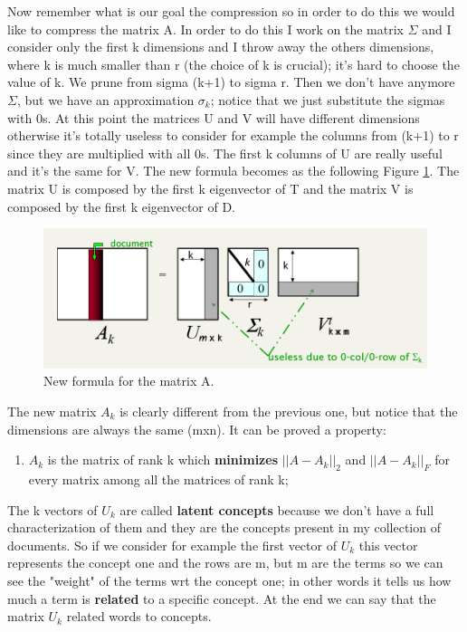 Now remember what is our goal the compression so in order to do this we would like to compress the matrix A. In order to do this I work on the matrix $\Sigma$ and I consider only the first k dimensions and I throw away the others dimensions, where k is much smaller than r (the choice of k is crucial); it's hard to choose the value of k. We prune from sigma (k+1) to sigma r. Then we don't have anymore $\Sigma$, but we have an approximation $\sigma_k$; notice that we just substitute the sigmas with 0s. At this point the matrices U and V will have different dimensions otherwise it's totally useless to consider for example the columns from (k+1) to r since they are multiplied with all 0s.\newline
The first k columns of U are really useful and it's the same for V. The new formula becomes as the following Figure \ref{fig:svd3}. The matrix U is composed by the first k eigenvector of T and the matrix V is composed by the first k eigenvector of D.\newline
\begin{figure}
    \centering
    \includegraphics[width=0.75\linewidth]{images/svd3.PNG}
    \caption{New formula for the matrix A.}
    \label{fig:svd3}
\end{figure}
The new matrix $A_k$ is clearly different from the previous one, but notice that the dimensions are always the same (mxn).\newline
It can be proved a property:
\begin{enumerate}
    \item $A_k$ is the matrix of rank k which \textbf{minimizes} $||A-A_k||_2$ and $||A-A_k||_F$ for every matrix among all the matrices of rank k;
\end{enumerate}
The k vectors of $U_k$ are called \textbf{latent concepts} because we don't have a full characterization of them and they are the concepts present in my collection of documents. So if we consider for example the first vector of $U_k$ this vector represents the concept one and the rows are m, but m are the terms so we can see the "weight" of the terms wrt the concept one; in other words it tells us how much a term is \textbf{related} to a specific concept. At the end we can say that the matrix $U_k$ related words to concepts.\newline
